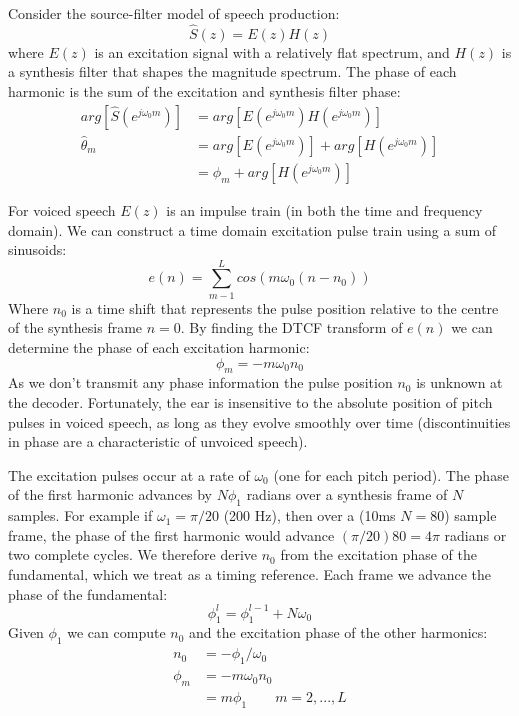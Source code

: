 \documentclass{article}
\begin{document}
{Consider the source-filter model of speech production:
\begin{equation}
\label{eq:source_filter}
\hat{S}(z)=E(z)H(z)
\end{equation}
where $E(z)$ is an excitation signal with a relatively flat spectrum, and $H(z)$ is a synthesis filter that shapes the magnitude spectrum.  The phase of each harmonic is the sum of the excitation and synthesis filter phase:
\begin{equation}
\begin{split}
arg \left[ \hat{S}(e^{j \omega_0 m}) \right] &= arg \left[ E(e^{j \omega_0 m}) H(e^{j \omega_0 m}) \right] \\
\hat{\theta}_m &= arg \left[ E(e^{j \omega_0 m}) \right] + arg \left[ H(e^{j \omega_0 m}) \right] \\
&= \phi_m +  arg \left[ H(e^{j \omega_0 m}) \right]
\end{split}
\end{equation}

For voiced speech $E(z)$ is an impulse train (in both the time and frequency domain). We can construct a time domain excitation pulse train using a sum of sinusoids:
\begin{equation}
e(n) = \sum_{m-1}^L cos( m \omega_0 (n - n_0))
\end{equation}
Where $n_0$ is a time shift that represents the pulse position relative to the centre of the synthesis frame $n=0$. By finding the DTCF transform of $e(n)$ we can determine the phase of each excitation harmonic:
\begin{equation}
\phi_m = - m \omega_0 n_0
\end{equation}
As we don't transmit any phase information the pulse position $n_0$ is unknown at the decoder.  Fortunately, the ear is insensitive to the absolute position of pitch pulses in voiced speech, as long as they evolve smoothly over time (discontinuities in phase are a characteristic of unvoiced speech).

The excitation pulses occur at a rate of $\omega_0$ (one for each pitch period). The phase of the first harmonic advances by $N \phi_1$ radians over a synthesis frame of $N$ samples.  For example if $\omega_1 = \pi /20$ (200 Hz), then over a (10ms $N=80$) sample frame, the phase of the first harmonic would advance $(\pi/20)80 = 4 \pi$ radians or two complete cycles. We therefore derive $n_0$ from the excitation phase of the fundamental, which we treat as a timing reference.  Each frame we advance the phase of the fundamental:
\begin{equation}
\phi_1^l = \phi_1^{l-1} + N\omega_0
\end{equation}
Given $\phi_1$ we can compute $n_0$ and the excitation phase of the other harmonics:
\begin{equation}
\begin{split}
n_0    &= -\phi_1 / \omega_0 \\
\phi_m &= - m \omega_0 n_0 \\
       &= m \phi_1 \quad \quad m=2,...,L
\end{split}
\end{equation}

}
\end{document}

